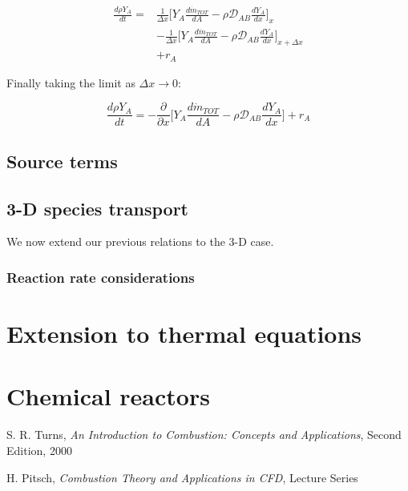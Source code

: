 \documentclass[10pt,twocolumn]{article}
\begin{document}
\begin{equation}
\begin{aligned}
\frac{d \rho Y_{A} }{dt} = & \frac{1}{\Delta x}\Big[ Y_A \frac{d \dot{m}_{TOT}}{d A} - \rho \mathcal{D}_{AB} \frac{dY_A}{dx} \Big]_x \\
& - \frac{1}{\Delta x} \Big[ Y_A \frac{d \dot{m}_{TOT}}{d A} - \rho \mathcal{D}_{AB} \frac{dY_A}{dx} \Big]_{x + \Delta x} \\
& + r_A
\end{aligned}
\end{equation}

Finally taking the limit as $\Delta x \rightarrow 0$:

\begin{equation}
\frac{d \rho Y_{A} }{dt} = - \frac{\partial}{\partial x}\Big[ Y_A \frac{d \dot{m}_{TOT}}{d A} - \rho \mathcal{D}_{AB} \frac{dY_A}{dx} \Big] + r_A
\end{equation}

\subsection{Source terms}

\subsection{3-D species transport}

We now extend our previous relations to the 3-D case.

\subsubsection{Reaction rate considerations}











\section{Extension to thermal equations}




\section{Chemical reactors}








\thebibliography{}

 S. R. Turns, \textit{An Introduction to Combustion: Concepts and Applications}, Second Edition, 2000 \label{bib:turns}

 H. Pitsch, \textit{Combustion Theory and Applications in CFD}, Lecture Series \label{bib:pitsch}


 \label{bib:pope}
\end{document}
